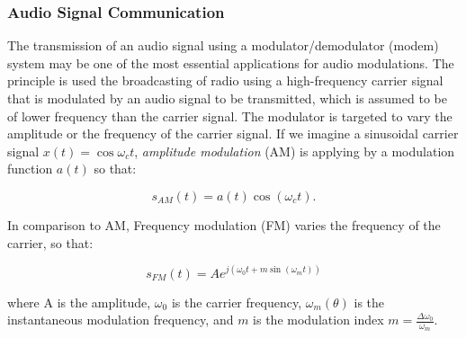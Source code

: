 \subsubsection*{Audio Signal Communication}

The transmission of an audio signal using a modulator/demodulator (modem) system may be one of the most essential applications for audio modulations. 
The principle is used the broadcasting of radio using a high-frequency carrier signal that is modulated by an audio signal to be transmitted, which is assumed to be of lower frequency than the carrier signal.
The modulator is targeted to vary the amplitude or the frequency of the carrier signal.
If we imagine a sinusoidal carrier signal $x(t) = \cos \omega_c t$, \emph{amplitude modulation} (AM) is applying by a modulation function $a(t)$ so that:


\begin{equation*}
    s_{AM}(t) = a(t) \cos \left( \omega_{c} t\right).    
\end{equation*}

In comparison to AM, Frequency modulation (FM) varies the frequency of the carrier, so that:

\begin{equation*}
    s_{FM}(t) = A e^{j\left(\omega_{0} t + m \sin \left(\omega_ { m } t \right)\right)}
\end{equation*}

where A is the amplitude, $\omega_0$ is the carrier frequency, $\omega_m(\theta)$ is the instantaneous modulation frequency, and $m$ is the modulation index $m = \frac{\Delta \omega_0} { \omega_{m} }$.

